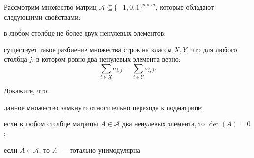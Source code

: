 Рассмотрим множество матриц $\mathcal{A} \subseteq \{-1, 0, 1\}^{n \times m}$, которые обладают
следующими свойствами:
\begin{itemtask}
    \item в любом столбце не более двух ненулевых элементов;
    \item существует такое разбиение множества строк на классы $X, Y$, что для любого столбца $j$, в
        котором ровно два ненулевых элемента верно:
        $$
            \sum\limits_{i \in X}{a_{i, j}} = \sum\limits_{i \in Y}{a_{i, j}}.
        $$
\end{itemtask}
    
Докажите, что:
\begin{enumcyr}
    \item данное множество замкнуто относительно перехода к подматрице;
    \item если в любом столбце матрицы $A \in \mathcal{A}$ два ненулевых элемента, то $\det(A) = 0$;
    \item если $A \in \mathcal{A}$, то $A$~--- тотально унимодулярна.
\end{enumcyr}